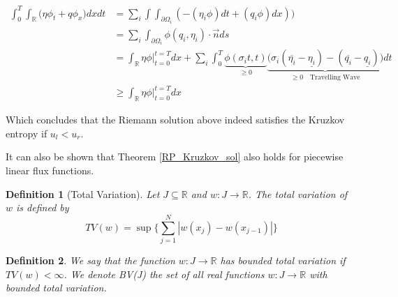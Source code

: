 \documentclass{article}
\newtheorem{theorem}{Theorem}[section]
\newtheorem{definition}{Definition}[section]
\numberwithin{equation}{section}
\begin{document}
\begin{equation}
\begin{split}
    \int_0^T \int_{\mathbb{R}} \big ( \eta \phi_t + q\phi_x\big ) dx dt &= \sum_i \int\int_{\partial \Omega_i}( -(\eta_i \phi)dt + (q_i \phi)dx )) \\
    &= \sum_i \int_{\partial \Omega_i} \phi(q_i,\eta_i) \cdot \Vec{n} ds \\
    &= \int_{\mathbb{R}} \eta \phi \bigg|_{t=0}^{t=T} dx + \sum_i \int_0^T \underbrace{\phi(\sigma_it,t)}_{\geq 0} \underbrace{\bigg( \sigma_i(\overline{\eta_i} - \underline{\eta_i}) -( \overline{q_i} -\underline{q_i}) \bigg )}_{\geq 0 \quad \text{Travelling Wave} }dt \\
    & \geq  \int_{\mathbb{R}} \eta \phi \bigg|_{t=0}^{t=T} dx
\end{split}
\end{equation}

Which concludes that the Riemann solution above indeed satisfies the Kruzkov entropy if $u_l < u_r$.

It can also be shown that Theorem \ref{RP_Kruzkov_sol} also holds for piecewise linear flux functions.


\begin{definition}[Total Variation]
Let $J \subseteq \mathbb{R}$ and $w : J \to \mathbb{R}$. The total variation of $w$ is defined by
\begin{equation}
    TV(w) = \sup \bigg \{ \sum_{j=1}^{N} |w(x_j)-w(x_{j-1})| \bigg \} 
\end{equation}
\end{definition}

\begin{definition}
We say that the function $w : J \to \mathbb{R}$ has bounded total variation if $TV(w) < \infty $. We denote BV(J) the set of all real functions  $w : J \to \mathbb{R}$ with bounded total variation. 
\end{definition}



\end{document}
